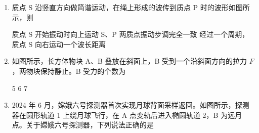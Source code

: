\documentclass[\gkver]{gaokaozhenti}
\begin{document}
\begin{enumerate}
{C．根据题意，由右手定则可知，线圈转到图示位置时，电流由 B$\to$A，由左手定则可知，AB 边受到的安培力方向向上，故 C 正确；

D．根据题意，由公式 $E_{m} = NBS\omega$ 可知，仅线圈转速加倍，电动势的最大值变为原来的 2 倍，为 $20 \UV$，故 D 错误。

故选 C。
}

\item
质点 S 沿竖直方向做简谐运动，在绳上形成的波传到质点 P 时的波形如图所示，则

\onepicture[w=5.17cm]{}

{质点 S 开始振动时向上运动}
{S、P 两质点振动步调完全一致}
{经过一个周期，质点 S 向右运动一个波长距离}


\item
如图所示，长方体物块 A、B 叠放在斜面上，B 受到一个沿斜面方向的拉力 $F$，两物块保持静止。B 受力的个数为

\onepicture[w=4.56cm]{}

{5}
{6}
{7}


\item
2024 年 6 月，嫦娥六号探测器首次实现月球背面采样返回。如图所示，探测器在圆形轨道 1 上绕月球飞行，在 A 点变轨后进入椭圆轨道 2，B 为远月点。关于嫦娥六号探测器，下列说法正确的是


\end{enumerate}
\end{document}
